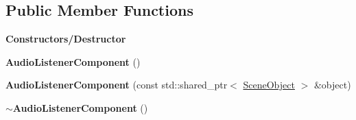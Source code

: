 \subsection*{Public Member Functions}
\begin{Indent}\textbf{ Constructors/\+Destructor}\par
\begin{DoxyCompactItemize}
\item 
\mbox{\label{classrev_1_1_audio_listener_component_a312d45120e132e5c27de760aaf0abe9b}} 
{\bfseries Audio\+Listener\+Component} ()
\item 
\mbox{\label{classrev_1_1_audio_listener_component_ab7229c39e1cce4f30fb5fbbcfb53d4a9}} 
{\bfseries Audio\+Listener\+Component} (const std\+::shared\+\_\+ptr$<$ \mbox{\hyperlink{classrev_1_1_scene_object}{Scene\+Object}} $>$ \&object)
\item 
\mbox{\label{classrev_1_1_audio_listener_component_ac85b8d15e8a67878eff00674fb26a39a}} 
{\bfseries $\sim$\+Audio\+Listener\+Component} ()
\end{DoxyCompactItemize}
\end{Indent}
